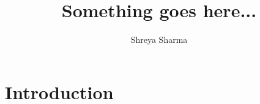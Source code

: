 \documentclass[12pt]{article}
\begin{document}
	\title{\large{Something goes here...}}
	\date{}
	\author{\small{Shreya Sharma}}
	\maketitle
	\tableofcontents
	
	\section{Introduction}
\end{document}
